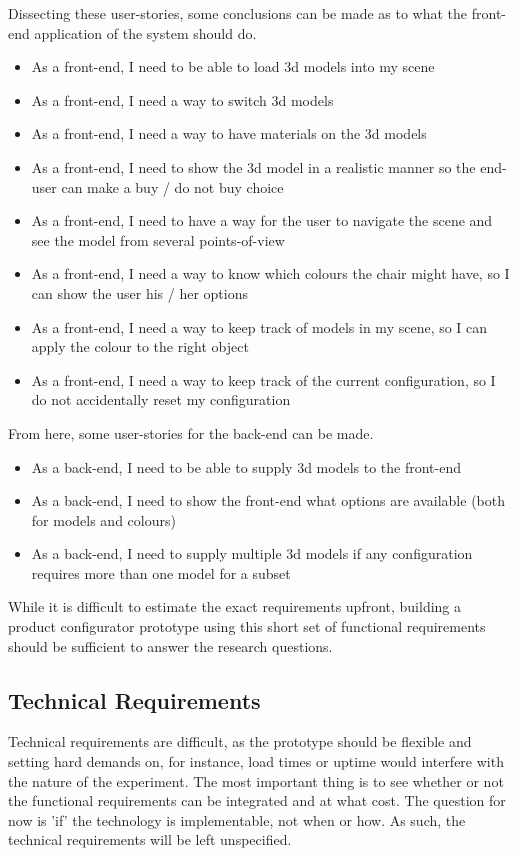 Dissecting these user-stories, some conclusions can be made as to what the front-end application of the system should do.
\begin{itemize}
	\item As a front-end, I need to be able to load 3d models into my scene
	\item As a front-end, I need a way to switch 3d models
	\item As a front-end, I need a way to have materials on the 3d models
	\item As a front-end, I need to show the 3d model in a realistic manner so the end-user can make a buy / do not buy choice
	\item As a front-end, I need to have a way for the user to navigate the scene and see the model from several points-of-view
	\item As a front-end, I need a way to know which colours the chair might have, so I can show the user his / her options
	\item As a front-end, I need a way to keep track of models in my scene, so I can apply the colour to the right object
	\item As a front-end, I need a way to keep track of the current configuration, so I do not accidentally reset my configuration
\end{itemize}

From here, some user-stories for the back-end can be made.
\begin{itemize}
	\item As a back-end, I need to be able to supply 3d models to the front-end
	\item As a back-end, I need to show the front-end what options are available (both for models and colours)
	\item As a back-end, I need to supply multiple 3d models if any configuration requires more than one model for a subset
\end{itemize}

While it is difficult to estimate the exact requirements upfront, building a product configurator prototype using this short set of functional requirements should be sufficient to answer the research questions. 

\subsection{Technical Requirements}
Technical requirements are difficult, as the prototype should be flexible and setting hard demands on, for instance, load times or uptime would interfere with the nature of the experiment. The most important thing is to see whether or not the functional requirements can be integrated and at what cost. The question for now is 'if' the technology is implementable, not when or how. As such, the technical requirements will be left unspecified.

